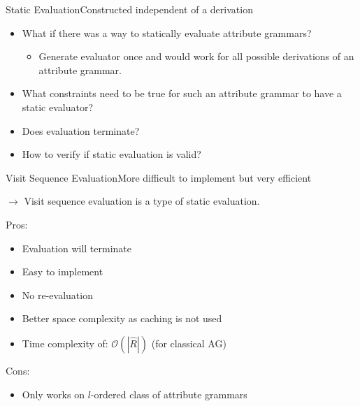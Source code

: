 \begin{frame}{Static Evaluation}{Constructed independent of a derivation}

\begin{itemize}
    \item What if there was a way to \alert{statically} evaluate attribute grammars?
    \begin{itemize}
        \item Generate evaluator \alert{once} and would \alert{work for all possible derivations} of an attribute grammar.
    \end{itemize}
    \item What \alert{constraints} need to be true for such an attribute grammar to have a static evaluator?
    \item Does evaluation \alert{terminate}?
    \item How to verify if static evaluation is \alert{valid}?
\end{itemize}
\end{frame}



\begin{frame}{Visit Sequence Evaluation}{More difficult to implement but very efficient}

$\to$ \alert{Visit sequence evaluation} is a \alert{type of static evaluation}.

\newlinevspace

Pros:
\begin{itemize}
    \item Evaluation \alert{will terminate}
    \item Easy to implement
    \item \alert{No re-evaluation}
    \item Better space complexity as caching is not used
    \item Time complexity of: $\mathcal{O}(| \hat{R} |)$ (for classical AG)
\end{itemize}

Cons:
\begin{itemize}
    \item Only works on \alert{$l$-ordered} class of attribute grammars
\end{itemize}
\end{frame}



